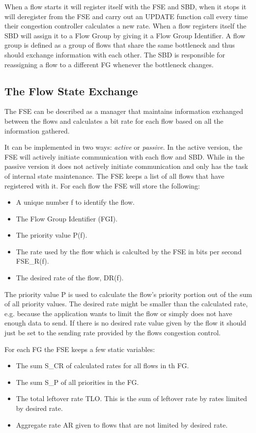 \documentclass[UKenglish]{ifimaster}
\begin{document}
When a flow starts it will register itself with the FSE and SBD, when it stops it will deregister from the FSE and carry out an UPDATE function call every time their congestion controller calculates a new rate.
When a flow registers itself the SBD will assign it to a Flow Group by giving it a Flow Group Identifier.
A flow group is defined as a group of flows that share the same bottleneck and thus should exchange information with each other. 
The SBD is responsible for reassigning a flow to a different FG whenever the bottleneck changes.
\subsection{The Flow State Exchange}
The FSE can be described as a manager that maintains information exchanged between the flows and calculates a bit rate for each flow based on all the information gathered. 

It can be implemented in two ways: \textit{active} or \textit{passive}.
In the active version, the FSE will actively initiate communication with each flow and SBD. 
While in the passive version it does not actively initiate communication and only has the task of internal state maintenance.
The FSE keeps a list of all flows that have registered with it.
For each flow the FSE will store the following:
\begin{itemize}
    \item A unique number f to identify the flow.
    \item The Flow Group Identifier (FGI).
    \item The priority value P(f).
    \item The rate used by the flow which is calculted by the FSE in bits per second FSE\_R(f).
    \item The desired rate of the flow, DR(f).
\end{itemize}

The priority value P is used to calculate the flow's priority portion out of the sum of all priority values.
The desired rate might be smaller than the calculated rate, e.g. because the application wants to limit the flow or simply does not have enough data to send. 
If there is no desired rate value given by the flow it should just be set to the sending rate provided by the flows congestion control.

For each FG the FSE keeps a few static variables:
\begin{itemize}
    \item The sum S\_CR of calculated rates for all flows in th FG.
    \item The sum S\_P of all priorities in the FG.
    \item The total leftover rate TLO. This is the sum of leftover rate by rates limited by desired rate.
    \item Aggregate rate AR given to flows that are not limited by desired rate. 
\end{itemize}
\end{document}
